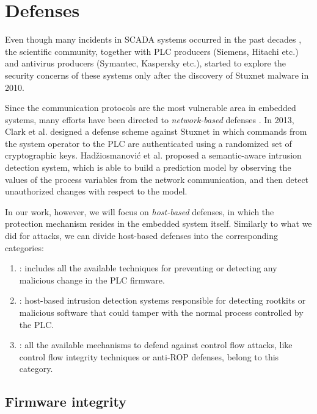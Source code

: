 \section{Defenses}

Even though many incidents in SCADA systems occurred in the past decades \cite{scada-attacks,scada-attacks2}, the scientific community,
together with PLC producers (Siemens, Hitachi etc.) and antivirus producers (Symantec, Kaspersky etc.), started to explore the security concerns of these systems
only after the discovery of Stuxnet malware in 2010.

Since the communication protocols are the most vulnerable area in embedded systems, many efforts have been directed to \emph{network-based} defenses \cite{plc-security}.
In 2013, Clark et al. \cite{stuxnet-defense} designed a defense scheme against Stuxnet in which commands from the system operator to the PLC
are authenticated using a randomized set of cryptographic keys.
Hadžiosmanović et al. \cite{semantic-defense} proposed a semantic-aware intrusion detection system, which is able to build a prediction model by observing
the values of the process variables from the network communication, and then detect unauthorized changes with respect to the model.

In our work, however, we will focus on \emph{host-based} defenses, in which the protection mechanism resides in the embedded system itself.
Similarly to what we did for attacks, we can divide host-based defenses into the corresponding categories:

\begin{enumerate}
	\item {}: includes all the available techniques for preventing or detecting any malicious change in the PLC firmware.
	\item {}: host-based intrusion detection systems responsible for detecting rootkits or malicious software
		that could tamper with the normal process controlled by the PLC.
	\item {}: all the available mechanisms to defend against control flow attacks, like control flow integrity techniques
		or anti-ROP defenses, belong to this category.
\end{enumerate}


\subsection{Firmware integrity}

